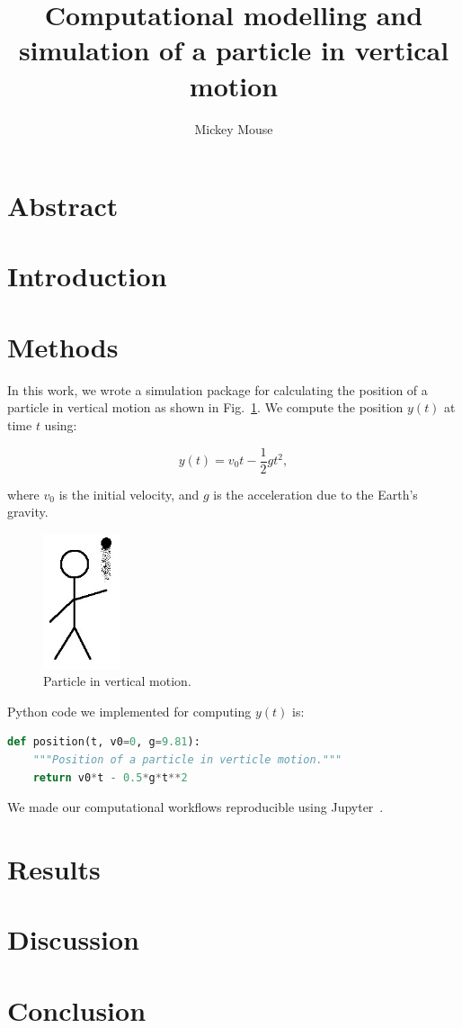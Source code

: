 \documentclass[project-plan]{report-template}
\title{Computational modelling and simulation of a particle in vertical motion}
\author{Mickey Mouse}
\begin{document}
\maketitlepage  %

\section*{Abstract}
\blindtext  %

\section{Introduction}
\blindtext[3]

\section{Methods}
In this work, we wrote a simulation package for calculating the position of a particle in vertical motion as shown in Fig.~\ref{fig:experiment}. We compute the position $y(t)$ at time $t$ using:

\begin{equation}
    \label{eq:vertical-position}
    y(t) = v_{0}t - \frac{1}{2}gt^{2},
\end{equation}

where $v_{0}$ is the initial velocity, and $g$ is the acceleration due to the Earth's gravity.

\begin{figure}
    \begin{center}
        \includegraphics[width=0.2\textwidth]{experiment.jpg}
    \end{center}
    \caption{\label{fig:experiment} Particle in vertical motion.}
\end{figure}

Python code we implemented for computing $y(t)$ is:

\begin{lstlisting}[language=Python]
def position(t, v0=0, g=9.81):
    """Position of a particle in verticle motion."""
    return v0*t - 0.5*g*t**2
\end{lstlisting}

We made our computational workflows reproducible using Jupyter~\cite{Beg2021}.

\section{Results}
\blindtext[3]

\section{Discussion}
\blindtext[2]

\section{Conclusion}
\blindtext[2]


\end{document}
